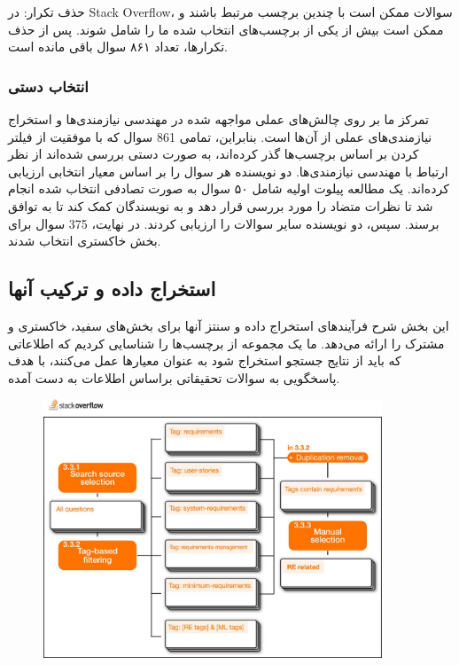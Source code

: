 \documentclass[a4paper,10pt]{article}
\begin{document}
                    حذف تکرار: در Stack Overflow، سوالات ممکن است با چندین برچسب مرتبط باشند و ممکن است بیش از یکی از برچسب‌های انتخاب شده ما را شامل شوند. پس از حذف تکرارها، تعداد ۸۶۱ سوال باقی مانده است.

                \subsubsection{انتخاب دستی}

                    تمرکز ما بر روی چالش‌های عملی مواجهه شده در مهندسی نیازمندی‌ها و استخراج نیازمندی‌های عملی از آن‌ها است. بنابراین، تمامی 861 سوال که با موفقیت از فیلتر کردن بر اساس برچسب‌ها گذر کرده‌اند، به صورت دستی بررسی شده‌اند از نظر ارتباط با مهندسی نیازمندی‌ها. دو نویسنده هر سوال را بر اساس معیار انتخابی ارزیابی کرده‌اند. یک مطالعه پیلوت اولیه شامل ۵۰ سوال به صورت تصادفی انتخاب شده انجام شد تا نظرات متضاد را مورد بررسی قرار دهد و به نویسندگان کمک کند تا به توافق برسند. سپس، دو نویسنده سایر سوالات را ارزیابی کردند. در نهایت، 375 سوال برای بخش خاکستری انتخاب شدند.
        
        \subsection{استخراج داده و ترکیب آنها}

            این بخش شرح فرآیندهای استخراج داده و سنتز آنها برای بخش‌های سفید، خاکستری و مشترک را ارائه می‌دهد. ما یک مجموعه از برچسب‌ها را شناسایی کردیم که اطلاعاتی که باید از نتایج جستجو استخراج شود به عنوان معیارها عمل می‌کنند، با هدف پاسخگویی به سوالات تحقیقاتی براساس اطلاعات به دست آمده.

            
            \begin{figure}
                \centering
                \includegraphics[width=0.9\textwidth]{Image/fig-2.jpg}
            \end{figure}
\end{document}
